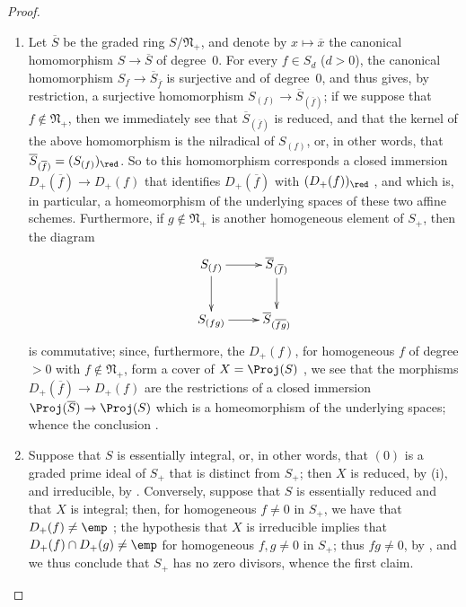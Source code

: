 \begin{proof}
\medskip\noindent
\begin{enumerate}
  \item[{\rm(i)}] Let $\overline{S}$ be the graded ring $S/\mathfrak{N}_+$, and denote by $x\mapsto\overline{x}$ the canonical homomorphism $S\to\overline{S}$ of degree~$0$.
    For every $f\in S_d$ ($d>0$), the canonical homomorphism $S_f\to\overline{S}_{\overline{f}}$  is surjective and of degree~$0$, and thus gives, by restriction, a surjective homomorphism $S_{(f)}\to\overline{S}_{(\overline{f})}$;
    if we suppose that $f\not\in\mathfrak{N}_+$, then we immediately see that $\overline{S}_{(\overline{f})}$  is reduced, and that the kernel of the above homomorphism is the nilradical of $S_{(f)}$, or, in other words, that $\overline{S}_{(\overline{f})}=(S_{(f)})_\red$.
    So to this homomorphism corresponds a closed immersion $D_+(\overline{f})\to D_+(f)$ that identifies $D_+(\overline{f})$ with $(D_+(f))_\red$ , and which is, in particular, a homeomorphism of the underlying spaces of these two affine schemes.
    Furthermore, if $g\not\in\mathfrak{N}_+$ is another homogeneous element of $S_+$, then the diagram
    \[
      \xymatrix{
        S_{(f)} \ar[r] \ar[d]
        & \overline{S}_{(\overline{f})} \ar[d]
      \\S_{(fg)} \ar[r]
        & \overline{S}_{(\overline{fg})}
      }
    \]
    is commutative;
    since, furthermore, the $D_+(f)$, for homogeneous $f$ of degree $>0$ with $f\not\in\mathfrak{N}_+$, form a cover of $X=\Proj(S)$ , we see that the morphisms $D_+(\overline{f})\to D_+(f)$ are the restrictions of a closed immersion $\Proj(\overline{S})\to\Proj(S)$ which is a homeomorphism of the underlying spaces;
    whence the conclusion .
  \item[{\rm(ii)}] Suppose that $S$ is essentially integral, or, in other words, that $(0)$ is a graded prime ideal of $S_+$ that is distinct from $S_+$;
    then $X$ is reduced, by (i), and irreducible, by .
    Conversely, suppose that $S$ is essentially reduced and that $X$ is integral;
    then, for homogeneous $f\neq0$ in $S_+$, we have that $D_+(f)\neq\emp$ ;
    the hypothesis that $X$ is irreducible implies that $D_+(f)\cap D_+(g)\neq\emp$ for homogeneous $f,g\neq0$ in $S_+$;
    thus $fg\neq0$, by , and we thus conclude that $S_+$ has no zero divisors, whence the first claim.
\end{enumerate}
\end{proof}

